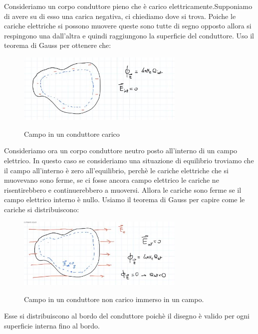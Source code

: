 \begin{esempio}	
Consideriamo un corpo conduttore pieno che è carico elettricamente.Supponiamo di avere su di esso una carica negativa, ci chiediamo dove si trova. Poiche le cariche elettriche si possono muovere queste sono tutte di segno opposto allora si respingono una dall'altra e quindi raggiungono la superficie del conduttore. Uso il teorema di Gauss per ottenere che:
\begin{figure}[h]
	\begin{center}
		\includegraphics[width=8cm]{lezione9/images/1 Campo elettrico nei materiali.jpg}\\
		\caption{Campo in un conduttore carico}
	\end{center}
\end{figure}
\end{esempio}
\begin{esempio}
	
Consideriamo ora un corpo conduttore neutro posto all'interno di un campo elettrico. In questo caso se consideriamo una situazione di equilibrio troviamo che il campo all'interno è zero all'equilibrio, perchè le cariche elettriche che si muovevano sono ferme, se ci fosse ancora campo elettrico le cariche ne risentirebbero e continuerebbero a muoversi. Allora le cariche sono ferme se il campo elettrico interno è nullo. Usiamo il teorema di Gauss per capire come le cariche si distribuiscono:

\begin{figure}[h]
	\begin{center}
		\includegraphics[width=8cm]{lezione9/images/2 Campo elettrico nei materiali.jpg}\\
		\caption{Campo in un conduttore non carico immerso in un campo.}
	\end{center}
\end{figure}

Esse si distribuiscono al bordo del conduttore poichè il disegno è valido per ogni superficie interna fino al bordo.
\end{esempio}

